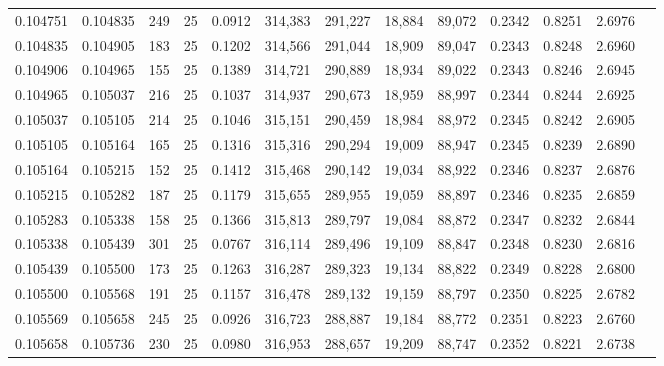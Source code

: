 \begin{tabular}{rrrrrrrrrrrrr}
0.104751 & 0.104835 &   249 &  25 &                                     0.0912 & 314,383 & 291,227 &  18,884 &  89,072 & 0.2342 & 0.8251 & 2.6976 \\
0.104835 & 0.104905 &   183 &  25 &                                     0.1202 & 314,566 & 291,044 &  18,909 &  89,047 & 0.2343 & 0.8248 & 2.6960 \\
0.104906 & 0.104965 &   155 &  25 &                                     0.1389 & 314,721 & 290,889 &  18,934 &  89,022 & 0.2343 & 0.8246 & 2.6945 \\
0.104965 & 0.105037 &   216 &  25 &                                     0.1037 & 314,937 & 290,673 &  18,959 &  88,997 & 0.2344 & 0.8244 & 2.6925 \\
0.105037 & 0.105105 &   214 &  25 &                                     0.1046 & 315,151 & 290,459 &  18,984 &  88,972 & 0.2345 & 0.8242 & 2.6905 \\
0.105105 & 0.105164 &   165 &  25 &                                     0.1316 & 315,316 & 290,294 &  19,009 &  88,947 & 0.2345 & 0.8239 & 2.6890 \\
0.105164 & 0.105215 &   152 &  25 &                                     0.1412 & 315,468 & 290,142 &  19,034 &  88,922 & 0.2346 & 0.8237 & 2.6876 \\
0.105215 & 0.105282 &   187 &  25 &                                     0.1179 & 315,655 & 289,955 &  19,059 &  88,897 & 0.2346 & 0.8235 & 2.6859 \\
0.105283 & 0.105338 &   158 &  25 &                                     0.1366 & 315,813 & 289,797 &  19,084 &  88,872 & 0.2347 & 0.8232 & 2.6844 \\
0.105338 & 0.105439 &   301 &  25 &                                     0.0767 & 316,114 & 289,496 &  19,109 &  88,847 & 0.2348 & 0.8230 & 2.6816 \\
0.105439 & 0.105500 &   173 &  25 &                                     0.1263 & 316,287 & 289,323 &  19,134 &  88,822 & 0.2349 & 0.8228 & 2.6800 \\
0.105500 & 0.105568 &   191 &  25 &                                     0.1157 & 316,478 & 289,132 &  19,159 &  88,797 & 0.2350 & 0.8225 & 2.6782 \\
0.105569 & 0.105658 &   245 &  25 &                                     0.0926 & 316,723 & 288,887 &  19,184 &  88,772 & 0.2351 & 0.8223 & 2.6760 \\
0.105658 & 0.105736 &   230 &  25 &                                     0.0980 & 316,953 & 288,657 &  19,209 &  88,747 & 0.2352 & 0.8221 & 2.6738 \\

\end{tabular}
